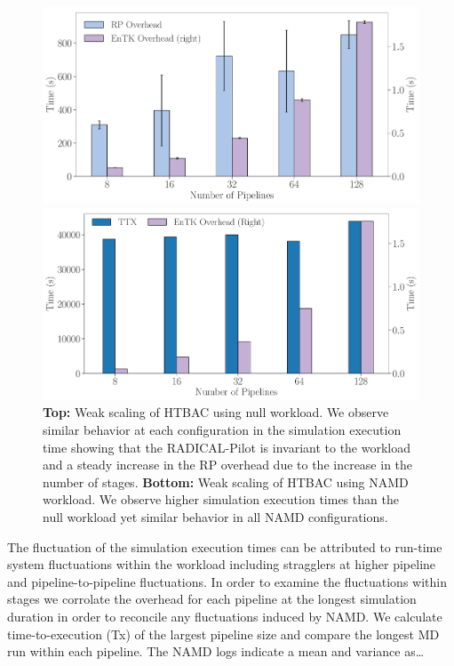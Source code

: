\begin{figure}[!htbp]
  \centering
  \begin{minipage}[b]{0.49\textwidth}
  \centering
  \includegraphics[width=\textwidth]{FIGURES/null_workload_overheads.pdf}
  \end{minipage}
  \begin{minipage}[b]{0.49\textwidth}
  \centering
  \includegraphics[width=\textwidth]{FIGURES/namd_workload_overheads.pdf}
  \end{minipage}
  \caption{\textbf{Top:} Weak scaling of HTBAC using null workload. We
          observe similar behavior at each configuration in the simulation
          execution time showing that the RADICAL-Pilot is invariant to the
          workload and a steady increase in the RP overhead due to the
          increase in the number of stages. \textbf{Bottom:} Weak scaling of
          HTBAC using NAMD workload. We observe higher simulation execution
          times than the null workload yet similar behavior in all NAMD
          configurations.}\label{fig:htbac_perf}
\end{figure}


The fluctuation of the simulation execution times can be attributed to
run-time system fluctuations within the workload including stragglers at
higher pipeline and pipeline-to-pipeline fluctuations. In order to examine
the fluctuations within stages we corrolate the overhead for each pipeline at
the longest simulation duration in order to reconcile any fluctuations
induced by NAMD\@. We calculate time-to-execution (Tx) of the largest
pipeline size and compare the longest MD run within each pipeline. The NAMD
logs indicate a mean and variance as\ldots

